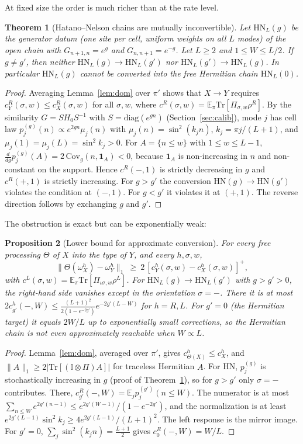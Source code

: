\documentclass[11pt]{article}
\newtheorem{theorem}{Theorem}
\newtheorem{proposition}[theorem]{Proposition}
\theoremstyle{definition}
\theoremstyle{remark}
\newcommand{\Tr}{\mathrm{Tr}}
\newcommand{\E}{\mathbb{E}}
\newcommand{\one}{\mathbb{I}}
\newcommand{\isig}{\iota\sigma}
\begin{document}
At fixed size the order is much richer than at the rate level.

\begin{theorem}[Hatano--Nelson chains are mutually inconvertible]\label{thm:HNinc}
Let $\mathrm{HN}_L(g)$ be the generator datum (one site per cell, uniform weights on all $L$ modes) of the open chain with $G_{n+1,n}=e^{g}$ and $G_{n,n+1}=e^{-g}$. Let $L\ge2$ and $1\le W\le L/2$. If $g\ne g'$, then neither $\mathrm{HN}_L(g)\to\mathrm{HN}_L(g')$ nor $\mathrm{HN}_L(g')\to\mathrm{HN}_L(g)$. In particular $\mathrm{HN}_L(g)$ cannot be converted into the free Hermitian chain $\mathrm{HN}_L(0)$.
\end{theorem}
\begin{proof}
Averaging Lemma~\ref{lem:dom} over $\pi'$ shows that $X\to Y$ requires $c^R_Y(\sigma,w)\le c^R_X(\sigma,w)$ for all $\sigma,w$, where $c^R(\sigma,w)=\E_\pi\Tr[\Pi_{\sigma,w}\rho^R]$. By the similarity $G=SH_0S^{-1}$ with $S=\mathrm{diag}(e^{gn})$ (Section~\ref{sec:calib}), mode $j$ has cell law $p^{(g)}_j(n)\propto e^{2gn}\mu_j(n)$ with $\mu_j(n)=\sin^2(k_jn)$, $k_j=\pi j/(L+1)$, and $\mu_j(1)=\mu_j(L)=\sin^2k_j>0$. For $A=\{n\le w\}$ with $1\le w\le L-1$, $\frac{d}{dg}p^{(g)}_j(A)=2\,\mathrm{Cov}_g(n,\mathbf 1_A)<0$, because $\mathbf 1_A$ is non-increasing in $n$ and non-constant on the support. Hence $c^R(-,1)$ is strictly decreasing in $g$ and $c^R(+,1)$ is strictly increasing. For $g>g'$ the conversion $\mathrm{HN}(g)\to\mathrm{HN}(g')$ violates the condition at $(-,1)$. For $g<g'$ it violates it at $(+,1)$. The reverse direction follows by exchanging $g$ and $g'$.
\end{proof}

The obstruction is exact but can be exponentially weak:

\begin{proposition}[Lower bound for approximate conversion]\label{prop:approx}
For every free processing $\Theta$ of $X$ into the type of $Y$, and every $h,\sigma,w$,
\[
\|\Theta(\omega^h_X)-\omega^h_Y\|_1\ \ge\ 2\,[c^h_Y(\sigma,w)-c^h_X(\sigma,w)]^+ ,
\]
with $c^L(\sigma,w)=\E_\pi\Tr[\Pi_{\isig,w}\rho^L]$. For $\mathrm{HN}_L(g)\to\mathrm{HN}_L(g')$ with $g>g'>0$, the right-hand side vanishes except in the orientation $\sigma=-$. There it is at most $2c^h_{g'}(-,W)\le\frac{(L+1)^2}{2(1-e^{-2g'})}e^{-2g'(L-W)}$ for $h=R,L$. For $g'=0$ (the Hermitian target) it equals $2W/L$ up to exponentially small corrections, so the Hermitian chain is not even approximately reachable when $W\propto L$.
\end{proposition}
\begin{proof}
Lemma~\ref{lem:dom}, averaged over $\pi'$, gives $c^h_{\Theta(X)}\le c^h_X$, and $\|A\|_1\ge2|\Tr[(\one\otimes\Pi)A]|$ for traceless Hermitian $A$. For HN, $p^{(g)}_j$ is stochastically increasing in $g$ (proof of Theorem~\ref{thm:HNinc}), so for $g>g'$ only $\sigma=-$ contributes. There, $c^R_{g'}(-,W)=\E_jp^{(g')}_j(n\le W)$. The numerator is at most $\sum_{n\le W}e^{2g'(n-1)}\le e^{2g'(W-1)}/(1-e^{-2g'})$, and the normalization is at least $e^{2g'(L-1)}\sin^2k_j\ge4e^{2g'(L-1)}/(L+1)^2$. The left response is the mirror image. For $g'=0$, $\sum_j\sin^2(k_jn)=\frac{L+1}2$ gives $c^R_0(-,W)=W/L$.
\end{proof}
\end{document}
